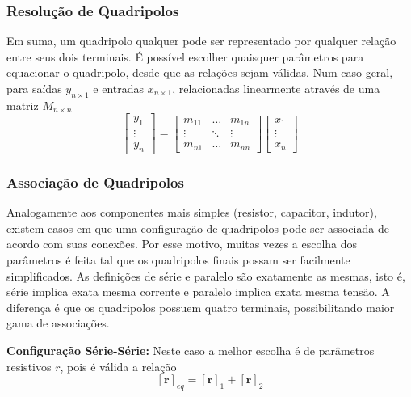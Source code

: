 \documentclass{article}
\numberwithin{equation}{section}
\newcommand{\itembull}[1]{\noindent\textbf{\small{\textbullet \hspace{1.5mm}#1}}}
\begin{document}
\subsubsection{Resolução de Quadripolos}
\label{subsubsec:quadripolosgenerico}
Em suma, um quadripolo qualquer pode ser representado por qualquer relação entre seus dois terminais. É possível escolher quaisquer parâmetros para equacionar o quadripolo, desde que as relações sejam válidas. Num caso geral, para saídas $y_{n\times1}$ e entradas $x_{n\times1}$, relacionadas linearmente através de uma matriz $M_{n\times n}$
\begin{equation*}
    \begin{bmatrix}
        y_{1} \\
        \vdots\\
        y_{n}
    \end{bmatrix}
    = %
    \begin{bmatrix}
        m_{11} & \dots & m_{1n}\\
        \vdots & \ddots& \vdots\\
        m_{n1} & \dots & m_{nn}
    \end{bmatrix}
    \begin{bmatrix}
        x_{1} \\
        \vdots\\
        x_{n}
    \end{bmatrix}
\end{equation*}

\subsubsection{Associação de Quadripolos}
\label{subsubsec:quadripolosassociacao}
Analogamente aos componentes mais simples (resistor, capacitor, indutor), existem casos em que uma configuração de quadripolos pode ser associada de acordo com suas conexões. Por esse motivo, muitas vezes a escolha dos parâmetros é feita tal que os quadripolos finais possam ser facilmente simplificados. As definições de série e paralelo são exatamente as mesmas, isto é, série implica exata mesma corrente e paralelo implica exata mesma tensão. A diferença é que os quadripolos possuem quatro terminais, possibilitando maior gama de associações.

\vspace{2mm}

\itembull{Configuração Série-Série:}
Neste caso a melhor escolha é de parâmetros resistivos $r$, pois é válida a relação
    $$ [\textbf{r}]_{eq} = [\textbf{r}]_{1} + [\textbf{r}]_{2} $$
\end{document}
